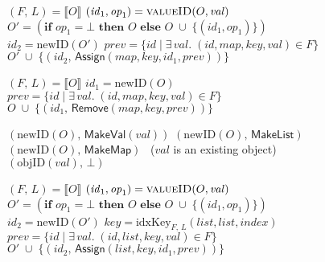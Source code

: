 \begin{figure}
\noindent
\renewcommand\algorithmicindent{10pt}
\begin{minipage}[t]{0.5\textwidth}
\begin{algorithmic}
    \State $(F,\, L) = \llbracket O \rrbracket$
    \State $(\mathit{id}_1, \mathit{op}_1) = \Call{valueID}{O, \mathit{val}}$
    \State $O' = (\textbf{if } \mathit{op}_1 = \bot \textbf{ then } O \textbf{ else } 
        O \;\cup\; \big\{ (\mathit{id}_1, \mathit{op}_1) \big\})$
    \State $\mathit{id}_2 = \mathrm{newID}(O')$
    \State $\mathit{prev} = \{ \mathit{id} \mid \exists\,\mathit{val}.\; (\mathit{id}, \mathit{map}, \mathit{key}, \mathit{val}) \in F \}$
    \State \Return $O' \;\cup\; \big\{ (\mathit{id}_2,\, \mathsf{Assign}(\mathit{map}, \mathit{key}, \mathit{id}_1, \mathit{prev})) \big\}$
    \EndFunction\Statex

    \State $(F,\, L) = \llbracket O \rrbracket$
    \State $\mathit{id}_1 = \mathrm{newID}(O)$
    \State $\mathit{prev} = \{ \mathit{id} \mid \exists\,\mathit{val}.\; (\mathit{id}, \mathit{map}, \mathit{key}, \mathit{val}) \in F \}$
    \State \Return $O \;\cup\; \big\{ (\mathit{id}_1,\, \mathsf{Remove}(\mathit{map}, \mathit{key}, \mathit{prev})) \big\}$
    \EndFunction\Statex

    \State \Return $(\mathrm{newID}(O),\, \mathsf{MakeVal}(\mathit{val}))$
    \State \Return $(\mathrm{newID}(O),\, \mathsf{MakeList})$
    \State \Return $(\mathrm{newID}(O),\, \mathsf{MakeMap})$
    \Else ~($\mathit{val}$ is an existing object)
    \State \Return $(\mathrm{objID}(\mathit{val}),\, \bot)$
    \EndIf
    \EndFunction
\end{algorithmic}
\end{minipage}%
\begin{minipage}[t]{0.5\textwidth}
\begin{algorithmic}
    \State $(F,\, L) = \llbracket O \rrbracket$
    \State $(\mathit{id}_1, \mathit{op}_1) = \Call{valueID}{O, \mathit{val}}$
    \State $O' = (\textbf{if } \mathit{op}_1 = \bot \textbf{ then } O \textbf{ else } 
        O \;\cup\; \big\{ (\mathit{id}_1, \mathit{op}_1) \big\})$
    \State $\mathit{id}_2 = \mathrm{newID}(O')$
    \State $\mathit{key} = \mathrm{idxKey}_{F,\, L}(\mathit{list}, \mathit{list}, \mathit{index})$
    \State $\mathit{prev} = \{ \mathit{id} \mid \exists\,\mathit{val}.\; (\mathit{id}, \mathit{list}, \mathit{key}, \mathit{val}) \in F \}$
    \State \Return $O' \;\cup\; \big\{ (\mathit{id}_2,\, \mathsf{Assign}(\mathit{list}, \mathit{key}, \mathit{id}_1, \mathit{prev})) \big\}$
    \EndFunction\Statex


\end{algorithmic}
\end{minipage}
\end{figure}
